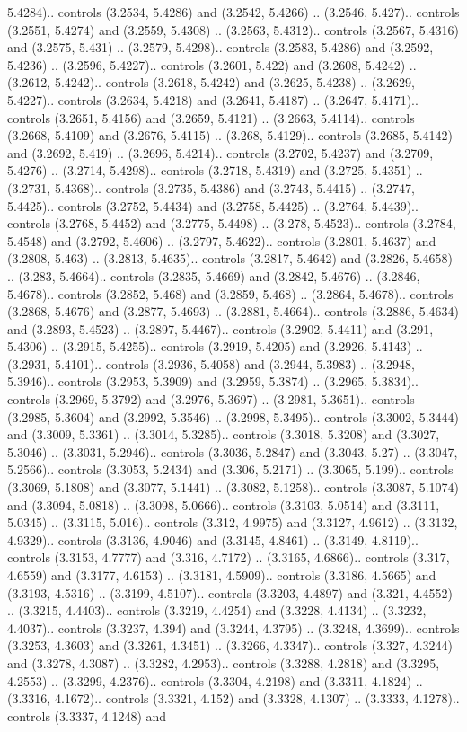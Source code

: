 5.4284).. controls (3.2534, 5.4286) and (3.2542, 5.4266) .. (3.2546, 5.427).. controls (3.2551, 5.4274) and (3.2559, 5.4308) .. (3.2563, 5.4312).. controls (3.2567, 5.4316) and (3.2575, 5.431) .. (3.2579, 5.4298).. controls (3.2583, 5.4286) and (3.2592, 5.4236) .. (3.2596, 5.4227).. controls (3.2601, 5.422) and (3.2608, 5.4242) .. (3.2612, 5.4242).. controls (3.2618, 5.4242) and (3.2625, 5.4238) .. (3.2629, 5.4227).. controls (3.2634, 5.4218) and (3.2641, 5.4187) .. (3.2647, 5.4171).. controls (3.2651, 5.4156) and (3.2659, 5.4121) .. (3.2663, 5.4114).. controls (3.2668, 5.4109) and (3.2676, 5.4115) .. (3.268, 5.4129).. controls (3.2685, 5.4142) and (3.2692, 5.419) .. (3.2696, 5.4214).. controls (3.2702, 5.4237) and (3.2709, 5.4276) .. (3.2714, 5.4298).. controls (3.2718, 5.4319) and (3.2725, 5.4351) .. (3.2731, 5.4368).. controls (3.2735, 5.4386) and (3.2743, 5.4415) .. (3.2747, 5.4425).. controls (3.2752, 5.4434) and (3.2758, 5.4425) .. (3.2764, 5.4439).. controls (3.2768, 5.4452) and (3.2775, 5.4498) .. (3.278, 5.4523).. controls (3.2784, 5.4548) and (3.2792, 5.4606) .. (3.2797, 5.4622).. controls (3.2801, 5.4637) and (3.2808, 5.463) .. (3.2813, 5.4635).. controls (3.2817, 5.4642) and (3.2826, 5.4658) .. (3.283, 5.4664).. controls (3.2835, 5.4669) and (3.2842, 5.4676) .. (3.2846, 5.4678).. controls (3.2852, 5.468) and (3.2859, 5.468) .. (3.2864, 5.4678).. controls (3.2868, 5.4676) and (3.2877, 5.4693) .. (3.2881, 5.4664).. controls (3.2886, 5.4634) and (3.2893, 5.4523) .. (3.2897, 5.4467).. controls (3.2902, 5.4411) and (3.291, 5.4306) .. (3.2915, 5.4255).. controls (3.2919, 5.4205) and (3.2926, 5.4143) .. (3.2931, 5.4101).. controls (3.2936, 5.4058) and (3.2944, 5.3983) .. (3.2948, 5.3946).. controls (3.2953, 5.3909) and (3.2959, 5.3874) .. (3.2965, 5.3834).. controls (3.2969, 5.3792) and (3.2976, 5.3697) .. (3.2981, 5.3651).. controls (3.2985, 5.3604) and (3.2992, 5.3546) .. (3.2998, 5.3495).. controls (3.3002, 5.3444) and (3.3009, 5.3361) .. (3.3014, 5.3285).. controls (3.3018, 5.3208) and (3.3027, 5.3046) .. (3.3031, 5.2946).. controls (3.3036, 5.2847) and (3.3043, 5.27) .. (3.3047, 5.2566).. controls (3.3053, 5.2434) and (3.306, 5.2171) .. (3.3065, 5.199).. controls (3.3069, 5.1808) and (3.3077, 5.1441) .. (3.3082, 5.1258).. controls (3.3087, 5.1074) and (3.3094, 5.0818) .. (3.3098, 5.0666).. controls (3.3103, 5.0514) and (3.3111, 5.0345) .. (3.3115, 5.016).. controls (3.312, 4.9975) and (3.3127, 4.9612) .. (3.3132, 4.9329).. controls (3.3136, 4.9046) and (3.3145, 4.8461) .. (3.3149, 4.8119).. controls (3.3153, 4.7777) and (3.316, 4.7172) .. (3.3165, 4.6866).. controls (3.317, 4.6559) and (3.3177, 4.6153) .. (3.3181, 4.5909).. controls (3.3186, 4.5665) and (3.3193, 4.5316) .. (3.3199, 4.5107).. controls (3.3203, 4.4897) and (3.321, 4.4552) .. (3.3215, 4.4403).. controls (3.3219, 4.4254) and (3.3228, 4.4134) .. (3.3232, 4.4037).. controls (3.3237, 4.394) and (3.3244, 4.3795) .. (3.3248, 4.3699).. controls (3.3253, 4.3603) and (3.3261, 4.3451) .. (3.3266, 4.3347).. controls (3.327, 4.3244) and (3.3278, 4.3087) .. (3.3282, 4.2953).. controls (3.3288, 4.2818) and (3.3295, 4.2553) .. (3.3299, 4.2376).. controls (3.3304, 4.2198) and (3.3311, 4.1824) .. (3.3316, 4.1672).. controls (3.3321, 4.152) and (3.3328, 4.1307) .. (3.3333, 4.1278).. controls (3.3337, 4.1248) and 